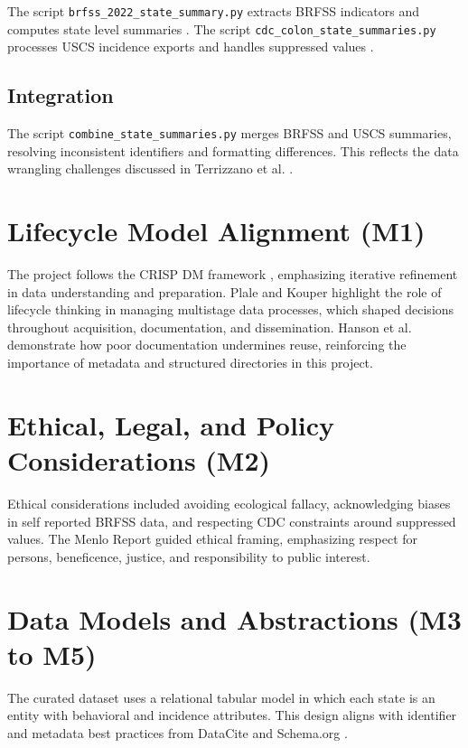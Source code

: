 \documentclass[12pt]{article}
\begin{document}
The script \texttt{brfss\_2022\_state\_summary.py} extracts BRFSS indicators and computes state level summaries \parencite{cdc2023brfss}.  
The script \texttt{cdc\_colon\_state\_summaries.py} processes USCS incidence exports and handles suppressed values \parencite{cdc2024uscs}.

\subsection{Integration}

The script \texttt{combine\_state\_summaries.py} merges BRFSS and USCS summaries, resolving inconsistent identifiers and formatting differences. This reflects the data wrangling challenges discussed in Terrizzano et al. \parencite{terrizzano2015}.

\section{Lifecycle Model Alignment (M1)}

The project follows the CRISP DM framework \parencite{chapman2000}, emphasizing iterative refinement in data understanding and preparation.  
Plale and Kouper \parencite{plale2017} highlight the role of lifecycle thinking in managing multistage data processes, which shaped decisions throughout acquisition, documentation, and dissemination.  
Hanson et al. \parencite{hanson2012} demonstrate how poor documentation undermines reuse, reinforcing the importance of metadata and structured directories in this project.

\section{Ethical, Legal, and Policy Considerations (M2)}

Ethical considerations included avoiding ecological fallacy, acknowledging biases in self reported BRFSS data, and respecting CDC constraints around suppressed values.  
The Menlo Report \parencite{bailey2012} guided ethical framing, emphasizing respect for persons, beneficence, justice, and responsibility to public interest.

\section{Data Models and Abstractions (M3 to M5)}

The curated dataset uses a relational tabular model in which each state is an entity with behavioral and incidence attributes. This design aligns with identifier and metadata best practices from DataCite \parencite{group2021} and Schema.org \parencite{schemaorg2024}.
\end{document}
